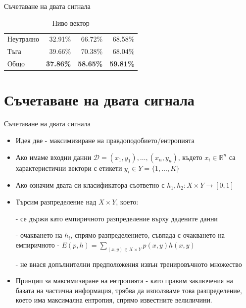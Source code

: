 \documentclass[9pt]{beamer}
\begin{document}
\begin{frame}[t]{Съчетаване на двата сигнала}
\begin{table}[h]
\begin{center}
{\begin{tabular}{|l|r r r|}
                    Неутрално & 32.91\%           & 66.72\%          & 68.58\%          \\
                    Тъга      & 39.66\%          & 70.38\%          & 68.04\%          \\
                    \hline
                    \hline
                    Общо      & \textbf{37.86\%} & \textbf{58.65\%} & \textbf{59.81\%} \\
                    \hline
                \end{tabular}}
                \caption*{Ниво вектор}
            \end{center}
        \end{table}
    \end{frame}

    \section{Съчетаване на двата сигнала}
    \begin{frame}[t]{Съчетаване на двата сигнала}
        \begin{itemize}
            \setlength\itemsep{\fill}
            \pause
            \item Идея две
            \pause - максимизиране на правдоподобието/ентропията
            \item Ако имаме входни данни $\mathcal{D} = (x_1, y_1),\ldots,(x_n, y_n)$, където $x_i \in \mathbb{R}^n$ са характеристични вектори с етикети $y_i \in Y=\{1,\ldots, K\}$
            \pause
            \item Ако означим двата си класификатора съответно с $h_1, h_2: X\times Y \rightarrow [0, 1]$
            \pause
            \item Търсим разпределение над $X\times Y$, което:
            
            \pause - се държи като емпиричното разпределение върху дадените данни
            
            \pause - очакването на $h_i$, спрямо разпределението, съвпада с очакването на емпиричното
            \pause - $E(p, h) = \sum\limits_{(x, y) \in X\times Y} p(x, y)h(x, y)$

            \pause - не внася допълнителни предположения извън тренировъчното множество
            \pause
            \item Принцип за максимизиране на ентропията
            \pause - като правим заключения на базата на частична информация, трябва да използваме това разпределение, което има максимална ентропия, спрямо известните велиличини.
        \end{itemize}
    \end{frame}
\end{document}
